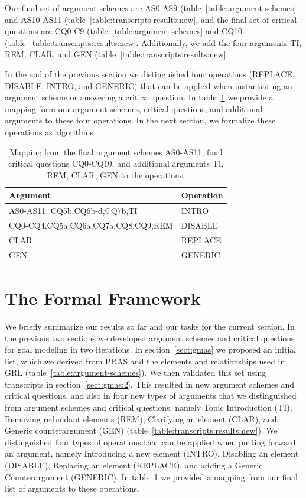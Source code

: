\documentclass[11.5pt,two column]{llncs}
\begin{document}
Our final set of argument schemes are AS0-AS9 (table~\ref{table:argument-schemes} and AS10-AS11 (table~\ref{table:transcripts:results:new}, and the final set of critical questions are CQ0-C9 (table~\ref{table:argument-schemes} and CQ10 (table~\ref{table:transcripts:results:new}. Additionally, we add the four arguments TI, REM, CLAR, and GEN (table~\ref{table:transcripts:results:new}.

In the end of the previous section we distinguished four operations (REPLACE, DISABLE, INTRO, and GENERIC) that can be applied when instantiating an argument scheme or answering a critical question. In table~\ref{table:operation-mappings} we provide a mapping form our argument schemes, critical questions, and additional arguments to these four operations. In the next section, we formalize these operations as algorithms.

\begin{table}[ht]
\begin{tabular}{|l|l|}
\hline
\textbf{Argument} & \textbf{Operation}\\
\hline
AS0-AS11, CQ5b,CQ6b-d,CQ7b,TI& INTRO\\
\hline
CQ0-CQ4,CQ5a,CQ6a,CQ7a,CQ8,CQ9,REM & DISABLE\\
\hline
CLAR & REPLACE\\
\hline
GEN & GENERIC\\
\hline
\end{tabular}
\caption{Mapping from the final argument schemes AS0-AS11, final critical questions CQ0-CQ10, and additional arguments TI, REM, CLAR, GEN to the operations.}
\label{table:operation-mappings}
\end{table}

\section{The Formal Framework}
\label{sect:formalframework}

We briefly summarize our results so far and our tasks for the current section. In the previous two sections we developed argument schemes and critical questions for goal modeling in two iterations. In section~\ref{sect:gmas} we proposed an initial list, which we derived from PRAS and the elements and relationships used in GRL (table~\ref{table:argument-schemes}). We then validated this set using transcripts in section~\ref{sect:gmas:2}. This resulted in new argument schemes and critical questions, and also in four new types of arguments that we distinguished from argument schemes and critical questions, namely Topic Introduction (TI), Removing redundant elements (REM), Clarifying an element (CLAR), and Generic counterargument (GEN) (table~\ref{table:transcripts:results:new}). We distinguished four types of operations that can be applied when putting forward an argument, namely Introducing a new element (INTRO), Disabling an element (DISABLE), Replacing an element (REPLACE), and adding a Generic Counterargument (GENERIC). In table~\ref{table:operation-mappings} we provided a mapping from our final list of arguments to these operations.
\end{document}
